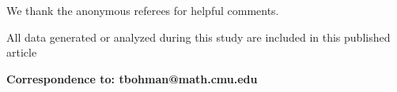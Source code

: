 \documentclass[12pt]{article}
\theoremstyle{definition}
\begin{document}
\vskip2mm

 We thank the anonymous referees for helpful comments.


\vskip2mm

 All data 
generated or analyzed during this study are included in this 
published article 




\vskip2mm

\noindent
{\bf Correspondence to: tbohman@math.cmu.edu}
\end{document}

